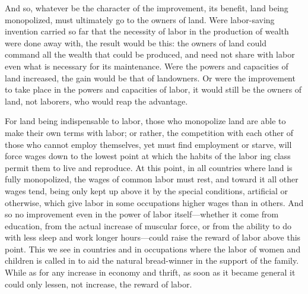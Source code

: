 \documentclass{book}
\begin{document}
And so, whatever be the character of the improvement, its benefit, land being monopolized, must ultimately go to the owners of land. Were labor-saving invention carried so far that the necessity of labor in the production of wealth were done away with, the result would be this: the owners of land could command all the wealth that could be produced, and need not share with labor even what is necessary for its maintenance. Were the powers and capacities of land increased, the gain would be that of landowners. Or were the improvement to take place in the powers and capacities of labor, it would still be the owners of land, not laborers, who would reap the advantage.

For land being indispensable to labor, those who monopolize land are able to make their own terms with labor; or rather, the competition with each other of those who cannot employ themselves, yet must find employment or starve, will force wages down to the lowest point at which the habits of the labor ing class permit them to live and reproduce. At this point, in all countries where land is fully monopolized, the wages of common labor must rest, and toward it all other wages tend, being only kept up above it by the special conditions, artificial or otherwise, which give labor in some occupations higher wages than in others. And so no improvement even in the power of labor itself—whether it come from education, from the actual increase of muscular force, or from the ability to do with less sleep and work longer hours—could raise the reward of labor above this point. This we see in countries and in occupations where the labor of women and children is called in to aid the natural bread-winner in the support of the family. While as for any increase in economy and thrift, as soon as it became general it could only lessen, not increase, the reward of labor.
\end{document}
